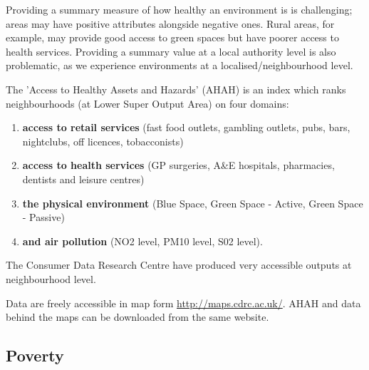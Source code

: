 Providing a summary measure of how healthy an environment is is challenging; areas may have positive attributes alongside negative ones. Rural areas, for example, may provide good access to green spaces but have poorer access to health services. Providing a summary value at a local authority level is also problematic, as we experience environments at a localised/neighbourhood level.

The 'Access to Healthy Assets and Hazards' (AHAH) is an index which ranks neighbourhoods (at Lower Super Output Area) on four domains:
\begin{enumerate}[noitemsep]
    \item {\bf access to retail services} (fast food outlets, gambling outlets, pubs, bars, nightclubs, off licences, tobacconists)
    \item {\bf access to health services} (GP surgeries, A\&E hospitals, pharmacies, dentists and leisure centres)
    \item {\bf the physical environment} (Blue Space, Green Space - Active, Green Space - Passive)
    \item {\bf and air pollution} (NO2 level, PM10 level, S02 level).
\end{enumerate}
The Consumer Data Research Centre have produced very accessible outputs at neighbourhood level.

Data are freely accessible in map form \url{http://maps.cdrc.ac.uk/}. AHAH and data behind the maps can be downloaded from the same website.


\subsection{Poverty}
